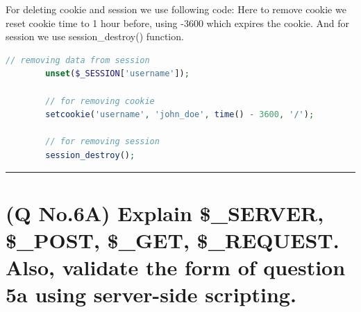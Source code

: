 \documentclass[11pt]{article}
\begin{document}
\begin{enumerate}
\begin{lstlisting}[language=php]
    \end{lstlisting}

    For deleting cookie and session we use following code:
    Here to remove cookie we reset cookie time to 1 hour before, using -3600 which expires the cookie. And for session we use session\_destroy() function.
    \begin{lstlisting}[language=php]
        // removing data from session 
        unset($_SESSION['username']);

        // for removing cookie
        setcookie('username', 'john_doe', time() - 3600, '/');

        // for removing session
        session_destroy();

    \end{lstlisting}
\end{enumerate}



\noindent\rule{\linewidth}{0.4pt}
\section{(Q No.6A) Explain \$\_SERVER, \$\_POST, \$\_GET, \$\_REQUEST. Also, validate the form of question 5a using server-side scripting. }
\subparagraph{}
\end{document}
